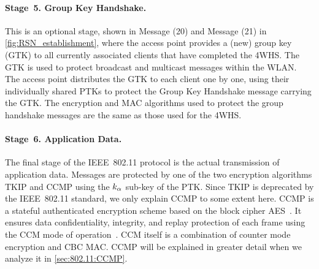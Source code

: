   


\paragraph{Stage~5. Group Key Handshake.}
This is an optional stage,
shown in Message (20) and Message (21) in \cref{fig:RSN_establishment},
where the access point provides a (new) group key (GTK) to all currently associated clients that have completed the 4WHS. 
The GTK is used to protect broadcast and multicast messages within the WLAN.
The access point distributes the GTK to each client one by one,
using their individually shared PTKs to protect the Group Key Handshake message carrying the GTK.
The encryption and MAC algorithms used to protect the group handshake messages are the same as those used for the 4WHS.





\paragraph{Stage~6. Application Data.}
The final stage of the IEEE~802.11 protocol is the actual transmission of application data.
Messages are protected by one of the two encryption algorithms TKIP and CCMP using the $k_\alpha$ sub-key of the PTK.
Since TKIP is deprecated by the IEEE~802.11 standard,
we only explain CCMP to some extent here.
CCMP is a stateful authenticated encryption scheme based on the block cipher AES~\cite{FIPS:197-2001:AES}.
It ensures data confidentiality, integrity, and replay protection of each frame using the CCM mode of operation~\cite{IETF:RFC3610:CCM}.
CCM itself is a combination of counter mode encryption and CBC MAC.
CCMP will be explained in greater detail when we analyze it in \cref{sec:802.11:CCMP}.




